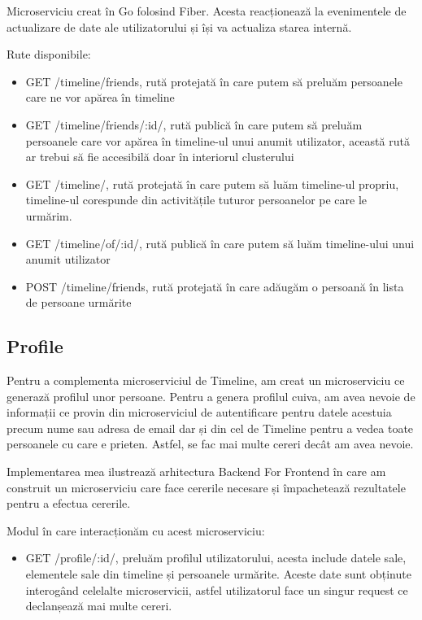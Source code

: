 Microserviciu creat în Go folosind Fiber. Acesta reacționează la evenimentele de actualizare
de date ale utilizatorului și își va actualiza starea internă.

Rute disponibile:
\begin{itemize}
      \item GET /timeline/friends, rută protejată în care putem să preluăm persoanele care ne vor apărea în timeline
      \item GET /timeline/friends/:id/, rută publică în care putem să preluăm persoanele care vor apărea în timeline-ul unui anumit utilizator,
            această rută ar trebui să fie accesibilă doar în interiorul clusterului
      \item GET /timeline/, rută protejată în care putem să luăm timeline-ul propriu, timeline-ul
            corespunde din activitățile tuturor persoanelor pe care le urmărim.
      \item GET /timeline/of/:id/, rută publică în care putem să luăm timeline-ului unui anumit utilizator
      \item POST /timeline/friends, rută protejată în care adăugăm o persoană în lista de persoane urmărite
\end{itemize}

\subsection{Profile}

Pentru a complementa microserviciul de Timeline, am creat un microserviciu ce generază profilul unor persoane.
Pentru a genera profilul cuiva, am avea nevoie de informații ce provin din microserviciul de autentificare pentru
datele acestuia precum nume sau adresa de email dar și din cel de Timeline pentru a vedea toate persoanele
cu care e prieten. Astfel, se fac mai multe cereri decât am avea nevoie.

Implementarea mea ilustrează arhitectura Backend For Frontend în care am construit un microserviciu
care face cererile necesare și împachetează rezultatele pentru a efectua cererile.

Modul în care interacționăm cu acest microserviciu:
\begin{itemize}
      \item GET /profile/:id/, preluăm profilul utilizatorului,
            acesta include datele sale, elementele sale din timeline și persoanele urmărite. Aceste date sunt obținute interogând celelalte microservicii, astfel utilizatorul face un singur request ce declanșează mai multe cereri.
\end{itemize}

